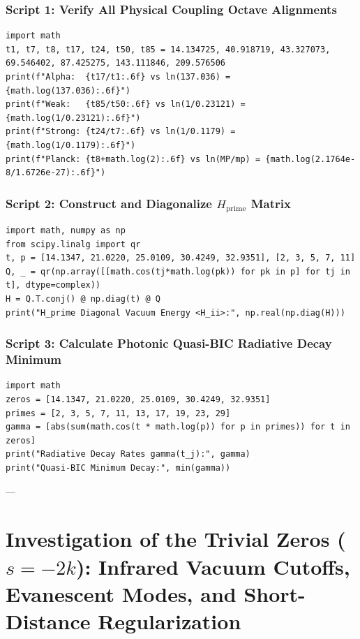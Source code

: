 \documentclass[11pt,a4paper]{article}
\begin{document}
\subsubsection{Script 1: Verify All Physical Coupling Octave Alignments}
\begin{lstlisting}[caption={5-line Python script verifying coupling octave alignments.}]
import math
t1, t7, t8, t17, t24, t50, t85 = 14.134725, 40.918719, 43.327073, 69.546402, 87.425275, 143.111846, 209.576506
print(f"Alpha:  {t17/t1:.6f} vs ln(137.036) = {math.log(137.036):.6f}")
print(f"Weak:   {t85/t50:.6f} vs ln(1/0.23121) = {math.log(1/0.23121):.6f}")
print(f"Strong: {t24/t7:.6f} vs ln(1/0.1179) = {math.log(1/0.1179):.6f}")
print(f"Planck: {t8+math.log(2):.6f} vs ln(MP/mp) = {math.log(2.1764e-8/1.6726e-27):.6f}")
\end{lstlisting}

\subsubsection{Script 2: Construct and Diagonalize $H_{\text{prime}}$ Matrix}
\begin{lstlisting}[caption={5-line Python script constructing $H_{\text{prime}}$ in prime state space.}]
import math, numpy as np
from scipy.linalg import qr
t, p = [14.1347, 21.0220, 25.0109, 30.4249, 32.9351], [2, 3, 5, 7, 11]
Q, _ = qr(np.array([[math.cos(tj*math.log(pk)) for pk in p] for tj in t], dtype=complex))
H = Q.T.conj() @ np.diag(t) @ Q
print("H_prime Diagonal Vacuum Energy <H_ii>:", np.real(np.diag(H)))
\end{lstlisting}

\subsubsection{Script 3: Calculate Photonic Quasi-BIC Radiative Decay Minimum}
\begin{lstlisting}[caption={5-line Python script calculating Photonic Quasi-BIC radiative decay rates.}]
import math
zeros = [14.1347, 21.0220, 25.0109, 30.4249, 32.9351]
primes = [2, 3, 5, 7, 11, 13, 17, 19, 23, 29]
gamma = [abs(sum(math.cos(t * math.log(p)) for p in primes)) for t in zeros]
print("Radiative Decay Rates gamma(t_j):", gamma)
print("Quasi-BIC Minimum Decay:", min(gamma))
\end{lstlisting}

---

\section{Investigation of the Trivial Zeros (\texorpdfstring{$s = -2k$}{s = -2k}): Infrared Vacuum Cutoffs, Evanescent Modes, and Short-Distance Regularization}
\end{document}
